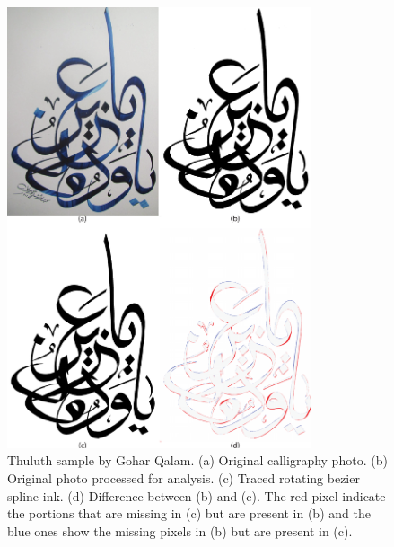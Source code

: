 {\begin{figure}[H]
  \centering
  \includegraphics[width=0.8\textwidth]{../Images/Thuluth_Ink.pdf}
  \caption
  {
      Thuluth sample by Gohar Qalam. (a) Original calligraphy photo. (b) Original photo processed for analysis. (c) Traced rotating bezier spline ink. (d) Difference between (b) and (c). The red pixel indicate the portions that are missing in (c) but are present in (b) and the blue ones show the missing pixels in (b) but are present in (c).
  }
\end{figure}

}
